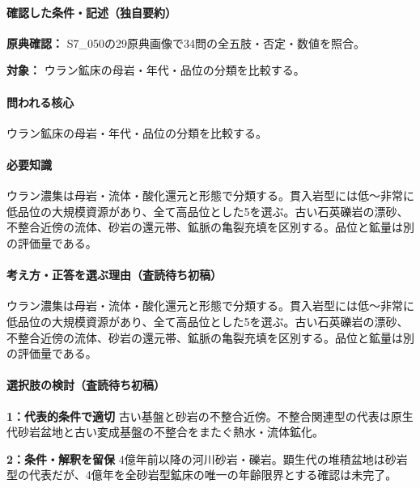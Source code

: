 \paragraph{確認した条件・記述（独自要約）}\mbox{}\par

\noindent\textbf{原典確認：} S7\_050の29原典画像で34問の全五肢・否定・数値を照合。\par

\noindent\textbf{対象：} ウラン鉱床の母岩・年代・品位の分類を比較する。\par

\paragraph{問われる核心} ウラン鉱床の母岩・年代・品位の分類を比較する。

\paragraph{必要知識} ウラン濃集は母岩・流体・酸化還元と形態で分類する。貫入岩型には低～非常に低品位の大規模資源があり、全て高品位とした5を選ぶ。古い石英礫岩の漂砂、不整合近傍の流体、砂岩の還元帯、鉱脈の亀裂充填を区別する。品位と鉱量は別の評価量である。

\paragraph{考え方・正答を選ぶ理由（査読待ち初稿）} ウラン濃集は母岩・流体・酸化還元と形態で分類する。貫入岩型には低～非常に低品位の大規模資源があり、全て高品位とした5を選ぶ。古い石英礫岩の漂砂、不整合近傍の流体、砂岩の還元帯、鉱脈の亀裂充填を区別する。品位と鉱量は別の評価量である。

\paragraph{選択肢の検討（査読待ち初稿）}\mbox{}\par

\noindent\textbf{1：代表的条件で適切} 古い基盤と砂岩の不整合近傍。不整合関連型の代表は原生代砂岩盆地と古い変成基盤の不整合をまたぐ熱水・流体鉱化。\par

\noindent\textbf{2：条件・解釈を留保} 4億年前以降の河川砂岩・礫岩。顕生代の堆積盆地は砂岩型の代表だが、4億年を全砂岩型鉱床の唯一の年齢限界とする確認は未完了。\par

